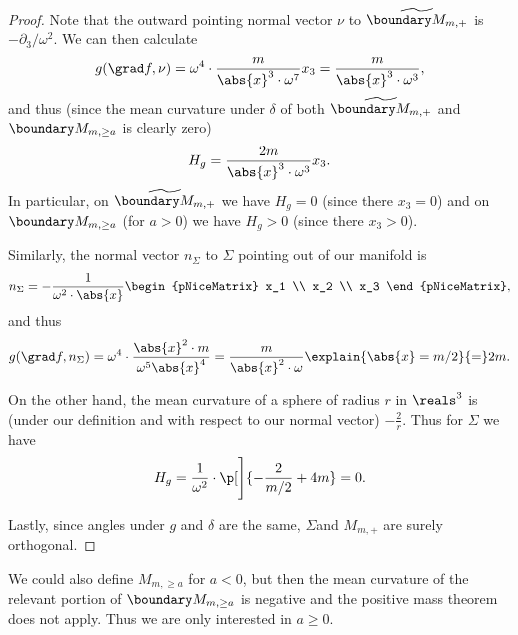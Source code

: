 \documentclass[titlepage,numbers=noenddot,headinclude,oneside,%
footinclude=true,cleardoublepage=empty,%
BCOR=5mm,paper=a4,fontsize=11pt,%
english,%
]{scrartcl}
\begin{document}
\begin{proof}
    Note that the outward pointing normal vector \( \nu \) to \( \schwarzschildboundary \) is \( -\partial_3/\omega^2 \).  We can then calculate
    \begin{equation*}
        g(\grad f,\nu)=\omega^4\cdot \frac{m}{\abs{x}^3\cdot \omega^7}x_3=\frac{m}{\abs{x}^3\cdot \omega^3},
    \end{equation*}
    and thus (since the mean curvature under \( \delta \) of both \( \schwarzschildboundary \) and \( \modifiedschwarzschildboundary \) is clearly zero)
    \begin{equation*}
        H_g=\frac{2m}{\abs{x}^3\cdot \omega^3}x_3.
    \end{equation*}
    In particular, on \( \schwarzschildboundary \) we have \( H_g=0 \) (since there \( x_3=0 \)) and on \( \modifiedschwarzschildboundary \) (for \( a>0 \)) we have \( H_g>0 \) (since there \( x_3>0 \)).

    Similarly, the normal vector \( n_\Sigma \) to \( \Sigma \) pointing out of our manifold is
    \begin{equation*}
        n_\Sigma =-\frac{1}{\omega^2\cdot \abs{x}} \begin{pNiceMatrix} x_1 \\ x_2 \\ x_3 \end{pNiceMatrix},
    \end{equation*}
    and thus
    \begin{equation*}
        g(\grad f,n_\Sigma)=\omega^4\cdot \frac{\abs{x}^2\cdot m}{\omega^5\abs{x}^4}=\frac{m}{\abs{x}^2\cdot \omega}\explain{\abs{x}=m/2}{=}2m.
    \end{equation*}

    On the other hand, the mean curvature of a sphere of radius \( r \) in \( \reals^3 \) is (under our definition and with respect to our normal vector) \( -\frac{2}{r} \). Thus for \( \Sigma \) we have
    \begin{equation*}
        H_g=\frac{1}{\omega^2}\cdot \p[\Bigg]{-\frac{2}{m/2}+4m}=0.
    \end{equation*}

    Lastly, since angles under \( g \) and \( \delta \) are the same, \( \Sigma \)and \( M_{m,+} \) are surely orthogonal. 
\end{proof}

\begin{remark}
    We could also define \( M_{m,\geq a} \) for \( a<0 \), but then the mean curvature of the relevant portion of \( \modifiedschwarzschildboundary \) is negative and the positive mass theorem does not apply. Thus we are only interested in \( a\geq 0 \).
\end{remark}
\end{document}
